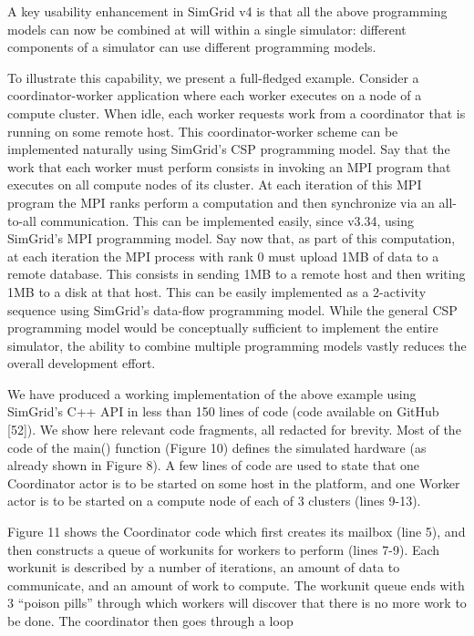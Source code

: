 \documentclass[
]{article}
\begin{document}
A key usability enhancement in SimGrid v4 is that all the above
programming models can now be combined at will within a single
simulator: different components of a simulator can use different
programming models.

To illustrate this capability, we present a full-fledged example.
Consider a coordinator-worker application where each worker executes on
a node of a compute cluster. When idle, each worker requests work from a
coordinator that is running on some remote host. This coordinator-worker
scheme can be implemented naturally using SimGrid's CSP programming
model. Say that the work that each worker must perform consists in
invoking an MPI program that executes on all compute nodes of its
cluster. At each iteration of this MPI program the MPI ranks perform a
computation and then synchronize via an all-to-all communication. This
can be implemented easily, since v3.34, using SimGrid's MPI programming
model. Say now that, as part of this computation, at each iteration the
MPI process with rank 0 must upload 1MB of data to a remote database.
This consists in sending 1MB to a remote host and then writing 1MB to a
disk at that host. This can be easily implemented as a 2-activity
sequence using SimGrid's data-flow programming model. While the general
CSP programming model would be conceptually sufficient to implement the
entire simulator, the ability to combine multiple programming models
vastly reduces the overall development effort.

We have produced a working implementation of the above example using
SimGrid's C++ API in less than 150 lines of code (code available on
GitHub {[}52{]}). We show here relevant code fragments, all redacted for
brevity. Most of the code of the main() function (Figure 10) defines the
simulated hardware (as already shown in Figure 8). A few lines of code
are used to state that one Coordinator actor is to be started on some
host in the platform, and one Worker actor is to be started on a compute
node of each of 3 clusters (lines 9-13).

Figure 11 shows the Coordinator code which first creates its mailbox
(line 5), and then constructs a queue of workunits for workers to
perform (lines 7-9). Each workunit is described by a number of
iterations, an amount of data to communicate, and an amount of work to
compute. The workunit queue ends with 3 ``poison pills'' through which
workers will discover that there is no more work to be done. The
coordinator then goes through a loop
\end{document}
